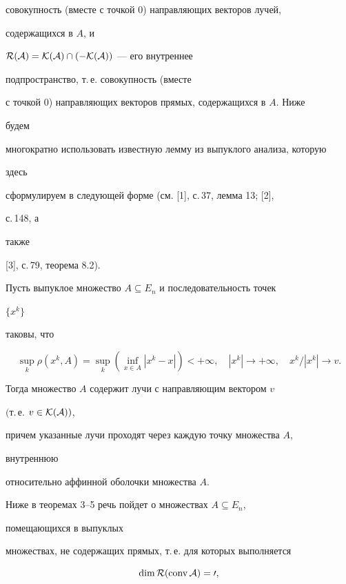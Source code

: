 совокупность (вместе с точкой $0$) направляющих векторов лучей, 


содержащихся в $A$, и 


$\cal R(A)=\cal K(A)\cap(-\cal K(A))$ --- его внутреннее 


подпространство, т.\,е. совокупность (вместе 


с точкой $0$) направляющих векторов прямых, содержащихся в $A$. Ниже 


будем 


многократно использовать известную лемму из выпуклого анализа, которую 


здесь 


сформулируем в следующей форме (см. [1], с.\,37, лемма 13; [2], 


с.\,148, а 


также 


[3], с.\,79, теорема 8.2). 


 


\begin{lem} 


Пусть выпуклое множество $A\subseteq E_n$ и последовательность точек 


$\{x^k\}$ 


таковы, что 


$$ 


\sup_k\rho(x^k,A)=\sup_k(\inf_{x\in A}|x^k-x|)<+\infty,\quad 


|x^k|\to+\infty,\quad x^k/|x^k|\to v. 


$$ 


Тогда множество $A$ содержит лучи с направляющим вектором $v$ 


$($т.\,е. $v\in\cal K(A))$, 


причем указанные лучи проходят через каждую точку множества $A$, 


внутреннюю 


относительно аффинной оболочки множества $A$. 


\end{lem} 


 


Ниже в теоремах 3--5 речь пойдет о множествах $A\subseteq E_n$, 


помещающихся в выпуклых 


множествах, не содержащих прямых, т.\,е. для которых выполняется 


\begin{equation} 


\dim\cal R(\conv A)=0, 


\end{equation} 



